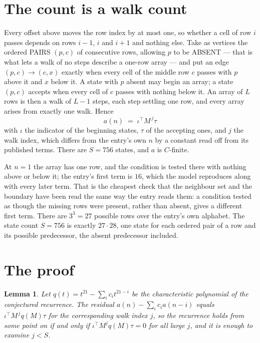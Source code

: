 \documentclass[11pt,a4paper]{article}
\theoremstyle{plain}
\newtheorem{lemma}[theorem]{Lemma}
\theoremstyle{definition}
\begin{document}
\section{The count is a walk count}

Every offset above moves the row index by at most one, so whether a cell of row $i$ passes
depends on rows $i-1$, $i$ and $i+1$ and nothing else. Take as vertices the ordered PAIRS
$(p,c)$ of consecutive rows, allowing $p$ to be ABSENT --- that is what lets a walk of no steps
describe a one-row array --- and put an edge $(p,c)\to(c,x)$ exactly when every cell of the
middle row $c$ passes with $p$ above it and $x$ below it. A state with $p$ absent may begin an
array; a state $(p,c)$ accepts when every cell of $c$ passes with nothing below it. An array of
$L$ rows is then a walk of $L-1$ steps, each step settling one row, and every array arises from
exactly one walk. Hence
\[
a(n)\;=\;\iota^{\!\top}M^{\,j}\tau
\]
with $\iota$ the indicator of the beginning states, $\tau$ of the accepting ones, and $j$ the
walk index, which differs from the entry's own $n$ by a constant read off from its published
terms. There are $S=756$ states, and $a$ is $C$-finite.

At $n=1$ the array has one row, and
the condition is tested there with nothing above or below it; the entry's first term is
$16$, which the model reproduces along with every later term. That is the cheapest check
that the neighbour set and the boundary have been read the same way the entry reads them: a
condition tested as though the missing rows were present, rather than absent, gives a different
first term. There are $3^{3}=27$ possible rows over the entry's own alphabet. The state count $S=756$ is exactly $27\cdot28$,
one state for each ordered pair of a row and its possible predecessor, the absent predecessor
included.

\section{The proof}

\begin{lemma}\label{lem:crit}
Let $q(t)=t^{21}-\sum_i c_it^{21-i}$ be the characteristic polynomial of the
conjectured recurrence. The residual $a(n)-\sum_ic_ia(n-i)$ equals
$\iota^{\!\top}M^{\,j}q(M)\tau$ for the corresponding walk index $j$, so the recurrence
holds from some point on if and only if $\iota^{\!\top}M^{j}q(M)\tau=0$ for all large $j$,
and it is enough to examine $j<S$.
\end{lemma}
\end{document}
